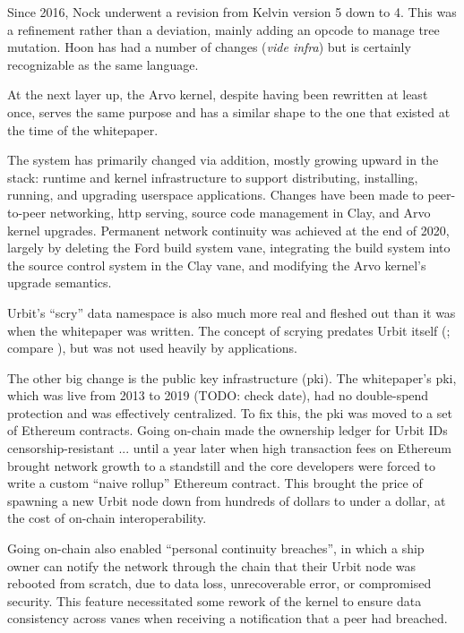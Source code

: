 \documentclass[twoside]{article}
\begin{document}
Since 2016, Nock underwent a revision from Kelvin version 5 down to 4.  This was a refinement rather than a deviation, mainly adding an opcode to manage tree mutation.  Hoon has had a number of changes (\emph{vide infra}) but is certainly recognizable as the same language.

At the next layer up, the Arvo kernel, despite having been rewritten at least once, serves the same purpose and has a similar shape to the one that existed at the time of the whitepaper.

The system has primarily changed via addition, mostly growing upward in the stack: runtime and kernel infrastructure to support distributing, installing, running, and upgrading userspace applications.  Changes have been made to peer-to-peer networking, {\sc http} serving, source code management in Clay, and Arvo kernel upgrades.  Permanent network continuity was achieved at the end of 2020, largely by deleting the Ford build system vane, integrating the build system into the source control system in the Clay vane, and modifying the Arvo kernel's upgrade semantics.

Urbit's ``scry'' data namespace is also much more real and fleshed out than it was when the whitepaper was written.  The concept of scrying predates Urbit itself (\citet{Yarvin2006a}; compare \citet{Yarvin2010}), but was not used heavily by applications.

The other big change is the public key infrastructure ({\sc pki}).  The whitepaper's {\sc pki}, which was live from 2013 to 2019 (TODO: check date), had no double-spend protection and was effectively centralized.  To fix this, the {\sc pki} was moved to a set of Ethereum contracts.  Going on-chain made the ownership ledger for Urbit IDs censorship-resistant ... until a year later when high transaction fees on Ethereum brought network growth to a standstill and the core developers were forced to write a custom ``naive rollup'' Ethereum contract.  This brought the price of spawning a new Urbit node down from hundreds of dollars to under a dollar, at the cost of on-chain interoperability.

Going on-chain also enabled ``personal continuity breaches'', in which a ship owner can notify the network through the chain that their Urbit node was rebooted from scratch, due to data loss, unrecoverable error, or compromised security.  This feature necessitated some rework of the kernel to ensure data consistency across vanes when receiving a notification that a peer had breached.
\end{document}
